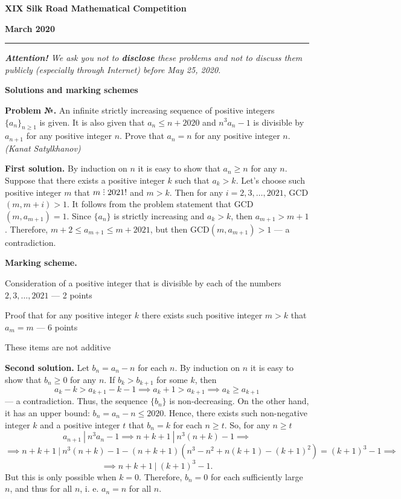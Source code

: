 \documentclass[12pt]{article}
\newcounter{problem}
\newcommand{\z}{\par  \smallskip \noindent \refstepcounter{problem}%
\textbf{Problem №\arabic{problem}.} }
\def\solI{\noindent \textbf{First solution. }}
\def\solII{\par \noindent \textbf{Second solution. }}
\DeclareRobustCommand{\divby}{%
  \mathrel{\text{\vbox{\baselineskip.65ex\lineskiplimit0pt\hbox{.}\hbox{.}\hbox{.}}}}%
}
\begin{document}
\centerline{\sc \textbf{XIX Silk Road Mathematical Competition}}

\centerline{\sc \textbf{March 2020}}

\bigskip
\hrule
\bigskip

\textsl{\textbf{Attention!} 
We ask you not to \textbf{disclose} these problems and not to discuss them publicly (especially through Internet) before May 25, 2020.}

\bigskip

\centerline{\sc \textbf{Solutions and marking schemes}}

\bigskip

\z An infinite strictly increasing sequence of positive integers $\{a_n\}_{n \geq 1}$ is given. It is also given that $a_n \leq n + 2020$ and $n^3 a_n - 1$ is divisible by $a_{n+1}$ for any positive integer $n$. Prove that $a_n = n$ for any positive integer $n$. \textit{(Kanat Satylkhanov)}

\bigskip

\solI By induction on $n$ it is easy to show that $a_n \geq n$ for any $n$. Suppose that there exists a positive integer $k$ such that $a_k > k$. Let's choose such positive integer $m$ that $m \divby 2021!$ and $m > k$. Then for any $i = 2, 3, \ldots, 2021$, GCD$(m, m+i) > 1$. It follows from the problem statement that GCD$(m, a_{m+1})=1$. Since $\{a_n\}$ is strictly increasing and $a_k > k$, then $a_{m+1} > m+1$. Therefore, $m + 2 \leq a_{m+1} \leq m + 2021$, but then GCD$(m, a_{m+1}) > 1$ --- a contradiction.

\bigskip

\textbf{Marking scheme.}
\begin{compactitem}
\item Consideration of a positive integer that is divisible by each of the numbers $2, 3, \ldots, 2021$ --- 2 points
\item Proof that for any positive integer $k$ there exists such positive integer $m > k$ that $a_m = m$ --- 6 points
\item These items are not additive
\end{compactitem}

\bigskip

\solII Let $b_n = a_n - n$ for each $n$. By induction on $n$ it is easy to show that $b_n \geq 0$ for any $n$. If $b_k > b_{k+1}$ for some $k$, then 
\[a_k - k > a_{k+1} - k - 1 \implies a_k + 1 > a_{k+1} \implies a_k \geq a_{k+1}\]
--- a contradiction. Thus, the sequence $\{b_n\}$ is non-decreasing. On the other hand, it has an upper bound: $b_n = a_n - n \leq 2020$. Hence, there exists such non-negative integer $k$ and a positive integer $t$ that $b_n = k$ for each $n \geq t$. So, for any $n \geq t$
\[a_{n+1} \ | \ n^3 a_n - 1 \implies n + k + 1 \ | \ n^3 (n + k) - 1 \implies\]
\[\implies n + k + 1 \ | \ n^3 (n + k) - 1 - (n + k + 1)(n^3 - n^2 + n(k+1) - (k+1)^2) = (k + 1)^3 - 1 \implies\]
\[\implies n + k + 1 \ | \ (k + 1)^3 - 1.\]
But this is only possible when $k = 0$. Therefore, $b_n = 0$ for each sufficiently large $n$, and thus for all $n$, i. e. $a_n = n$ for all $n$.
\end{document}

